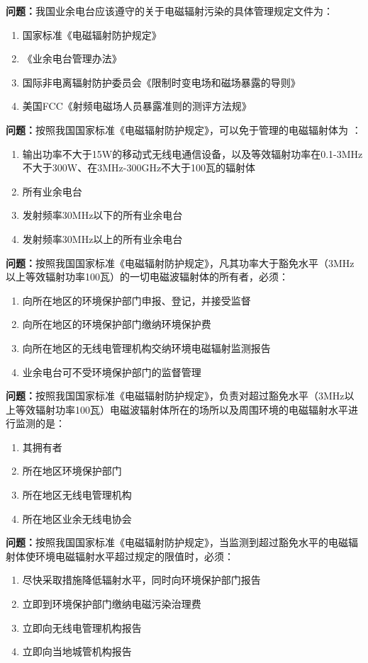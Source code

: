 \documentclass{ctexbook}
\begin{document}
\textbf{问题：}我国业余电台应该遵守的关于电磁辐射污染的具体管理规定文件为：
\begin{enumerate}[label=\Alph*), leftmargin=3em]
\item 国家标准《电磁辐射防护规定》
\item 《业余电台管理办法》
\item 国际非电离辐射防护委员会《限制时变电场和磁场暴露的导则》
\item 美国FCC《射频电磁场人员暴露准则的测评方法规》
\end{enumerate}

\textbf{问题：}按照我国国家标准《电磁辐射防护规定》，可以免于管理的电磁辐射体为 ：
\begin{enumerate}[label=\Alph*), leftmargin=3em]
\item 输出功率不大于15W的移动式无线电通信设备，以及等效辐射功率在0.1-3MHz不大于300W、在3MHz-300GHz不大于100瓦的辐射体
\item 所有业余电台
\item 发射频率30MHz以下的所有业余电台
\item 发射频率30MHz以上的所有业余电台
\end{enumerate}

\textbf{问题：}按照我国国家标准《电磁辐射防护规定》，凡其功率大于豁免水平（3MHz以上等效辐射功率100瓦）的一切电磁波辐射体的所有者，必须：
\begin{enumerate}[label=\Alph*), leftmargin=3em]
\item 向所在地区的环境保护部门申报、登记，并接受监督
\item 向所在地区的环境保护部门缴纳环境保护费
\item 向所在地区的无线电管理机构交纳环境电磁辐射监测报告
\item 业余电台可不受环境保护部门的监督管理
\end{enumerate}

\textbf{问题：}按照我国国家标准《电磁辐射防护规定》，负责对超过豁免水平（3MHz以上等效辐射功率100瓦）电磁波辐射体所在的场所以及周围环境的电磁辐射水平进行监测的是：
\begin{enumerate}[label=\Alph*), leftmargin=3em]
\item 其拥有者
\item 所在地区环境保护部门
\item 所在地区无线电管理机构
\item 所在地区业余无线电协会
\end{enumerate}

\textbf{问题：}按照我国国家标准《电磁辐射防护规定》，当监测到超过豁免水平的电磁辐射体使环境电磁辐射水平超过规定的限值时，必须：
\begin{enumerate}[label=\Alph*), leftmargin=3em]
\item 尽快采取措施降低辐射水平，同时向环境保护部门报告
\item 立即到环境保护部门缴纳电磁污染治理费
\item 立即向无线电管理机构报告
\item 立即向当地城管机构报告
\end{enumerate}
\end{document}
